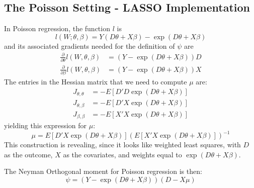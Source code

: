 \documentclass[11pt]{article}
\begin{document}
\subsection{The Poisson Setting - LASSO Implementation}
In Poisson regression, the function $l$ is
\begin{equation*}
	l(W; \theta, \beta) = Y(D\theta + X\beta) - \exp(D\theta + X\beta)
\end{equation*}
and its associated gradients needed for the definition of $\psi$ are
\begin{align*}
	\frac{\partial}{\partial \theta}l(W, \theta, \beta) &= (Y - \exp(D\theta + X\beta)) D \\
	\frac{\partial}{\partial \beta}l(W, \theta, \beta) &= (Y - \exp(D\theta + X\beta)) X
\end{align*}
The entries in the Hessian matrix that we need to compute $\mu$ are:
\begin{align*}
	J_{\theta, \theta} &= -E\left[D'D\exp(D\theta + X\beta)\right] \\
	J_{\theta, \beta} &= -E\left[D'X\exp(D\theta + X\beta)\right] \\
	J_{\beta, \beta} &= -E\left[X'X\exp(D\theta + X\beta)\right]
\end{align*}
yielding this expression for $\mu$:
\begin{equation*}
	\mu = E\left[D'X\exp(D\theta + X\beta)\right]\left(E\left[X'X\exp(D\theta + X\beta)\right]\right)^{-1}
\end{equation*}
This construction is revealing, since it looks like weighted least squares, with $D$ as the outcome, $X$ as the covariates, and weights equal to $\exp(D\theta + X\beta)$.

The Neyman Orthogonal moment for Poisson regression is then:
\begin{equation*}
	\psi = (Y - \exp(D\theta + X\beta))(D - X\mu)
\end{equation*}
\end{document}
